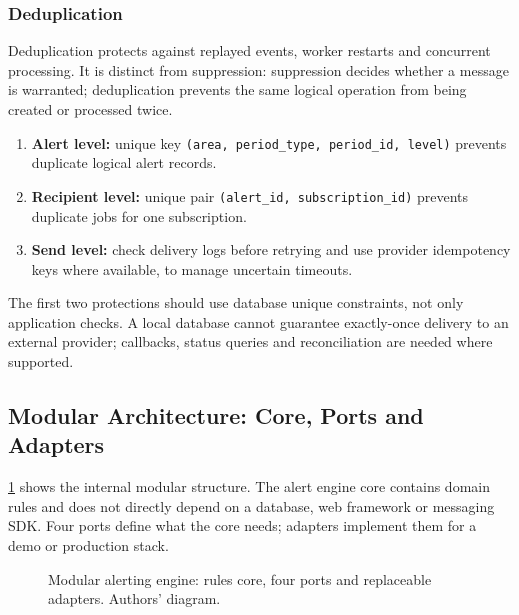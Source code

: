 \documentclass[10pt,openany]{report}
\begin{document}
\subsubsection{Deduplication}
Deduplication protects against replayed events, worker restarts and concurrent processing. It is distinct from suppression: suppression decides whether a message is warranted; deduplication prevents the same logical operation from being created or processed twice.
\begin{enumerate}
\item \textbf{Alert level:} unique key \texttt{(area, period\_type, period\_id, level)} prevents duplicate logical alert records.
\item \textbf{Recipient level:} unique pair \texttt{(alert\_id, subscription\_id)} prevents duplicate jobs for one subscription.
\item \textbf{Send level:} check delivery logs before retrying and use provider idempotency keys where available, to manage uncertain timeouts.
\end{enumerate}
The first two protections should use database unique constraints, not only application checks. A local database cannot guarantee exactly-once delivery to an external provider; callbacks, status queries and reconciliation are needed where supported.

\subsection{Modular Architecture: Core, Ports and Adapters}
\cref{fig:alerting-modular} shows the internal modular structure. The alert engine core contains domain rules and does not directly depend on a database, web framework or messaging SDK. Four ports define what the core needs; adapters implement them for a demo or production stack.
\begin{figure}[htbp]\centering
\resizebox{\textwidth}{!}{}
\caption{Modular alerting engine: rules core, four ports and replaceable adapters. Authors' diagram.}\label{fig:alerting-modular}\end{figure}
\end{document}
